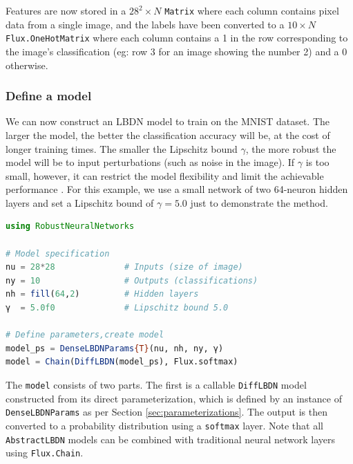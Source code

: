 Features are now stored in a $28^2\times N$ \verb|Matrix| where each column contains pixel data from a single image, and the labels have been converted to a $10\times N$ \verb|Flux.OneHotMatrix| where each column contains a 1 in the row corresponding to the image's classification (eg: row 3 for an image showing the number 2) and a 0 otherwise.

\subsubsection{Define a model} \label{sec:mnist-model}

We can now construct an LBDN model to train on the MNIST dataset. The larger the model, the better the classification accuracy will be, at the cost of longer training times. The smaller the Lipschitz bound $\gamma$, the more robust the model will be to input perturbations (such as noise in the image). If $\gamma$ is too small, however, it can restrict the model flexibility and limit the achievable performance \cite{Wang+Manchester2023}. For this example, we use a small network of two 64-neuron hidden layers and set a Lipschitz bound of $\gamma=5.0$ just to demonstrate the method.

\begin{lstlisting}[language = Julia]
using RobustNeuralNetworks

# Model specification
nu = 28*28              # Inputs (size of image)
ny = 10                 # Outputs (classifications)
nh = fill(64,2)         # Hidden layers 
γ  = 5.0f0              # Lipschitz bound 5.0

# Define parameters,create model
model_ps = DenseLBDNParams{T}(nu, nh, ny, γ)
model = Chain(DiffLBDN(model_ps), Flux.softmax)
\end{lstlisting}

The \verb|model| consists of two parts. The first is a callable \verb|DiffLBDN| model constructed from its direct parameterization, which is defined by an instance of \verb|DenseLBDNParams| as per Section \ref{sec:parameterizations}. The output is then converted to a probability distribution using a \verb|softmax| layer. Note that all \verb|AbstractLBDN| models can be combined with traditional neural network layers using \verb|Flux.Chain|. 

